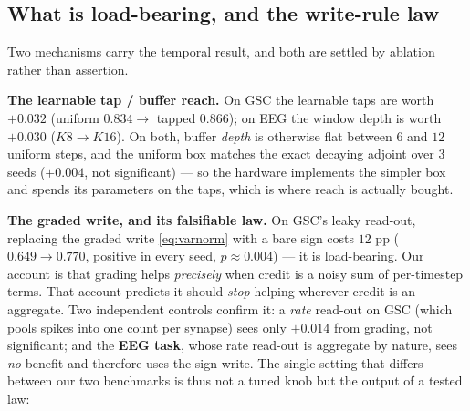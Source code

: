 \documentclass[11pt]{article}
\begin{document}
\hypertarget{what-is-load-bearing-and-the-write-rule-law}{%
\subsection{What is load-bearing, and the write-rule
law}\label{what-is-load-bearing-and-the-write-rule-law}}

Two mechanisms carry the temporal result, and both are settled by
ablation rather than assertion.

\textbf{The learnable tap / buffer reach.} On GSC the learnable taps are
worth \(+0.032\) (uniform \(0.834 \to\) tapped \(0.866\)); on EEG the
window depth is worth \(+0.030\) (\(K8\to K16\)). On both, buffer
\emph{depth} is otherwise flat between \(6\) and \(12\) uniform steps,
and the uniform box matches the exact decaying adjoint over \(3\) seeds
(\(+0.004\), not significant) --- so the hardware implements the simpler
box and spends its parameters on the taps, which is where reach is
actually bought.

\textbf{The graded write, and its falsifiable law.} On GSC's leaky
read-out, replacing the graded write \eqref{eq:varnorm} with a bare sign
costs \(12\) pp (\(0.649 \to 0.770\), positive in every seed,
\(p\approx0.004\)) --- it is load-bearing. Our account is that grading
helps \emph{precisely} when credit is a noisy sum of per-timestep terms.
That account predicts it should \emph{stop} helping wherever credit is
an aggregate. Two independent controls confirm it: a \emph{rate}
read-out on GSC (which pools spikes into one count per synapse) sees
only \(+0.014\) from grading, not significant; and the \textbf{EEG
task}, whose rate read-out is aggregate by nature, sees \emph{no}
benefit and therefore uses the sign write. The single setting that
differs between our two benchmarks is thus not a tuned knob but the
output of a tested law:
\end{document}
